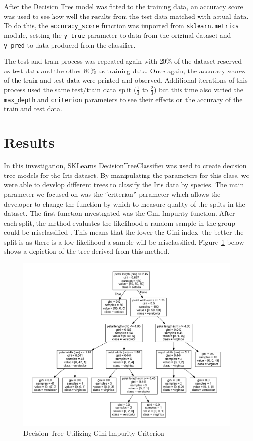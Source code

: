 \documentclass[journal]{IEEEtran}
\begin{document}
After the Decision Tree model was fitted to the training data, an accuracy score was used to see how well the results from the test data matched with actual data. To do this, the \lstinline{accuracy_score} function was imported from \lstinline{sklearn.metrics} module, setting the \lstinline{y_true} parameter to data from the original dataset and \lstinline{y_pred} to data produced from the classifier. 

The test and train process was repeated again with 20\% of the dataset reserved as test data and the other 80\% as training data. Once again, the accuracy scores of the train and test data were printed and observed. Additional iterations of this process used the same test/train data split (\(\frac{1}{3}\) to \(\frac{2}{3}\)) but this time also varied the \lstinline{max_depth} and \lstinline{criterion} parameters to see their effects on the accuracy of the train and test data.

\vspace{30px}
\section{Results}

In this investigation, SKLearn\textquotesingle s DecisionTreeClassifier was used to create decision tree models for the Iris dataset. By manipulating the parameters for this class, we were able to develop different trees to classify the Iris data by species. The main parameter we focused on was the “criterion” parameter which allows the developer to change the function by which to measure quality of the splits in the dataset. The first function investigated was the Gini Impurity function. After each split, the method evaluates the likelihood a random sample in the group could be misclassified \cite{b2}. This means that the lower the Gini index, the better the split is as there is a low likelihood a sample will be misclassified. Figure~\ref{fig:dtGI} below shows a depiction of the tree derived from this method.

\begin{figure}[h!]
\includegraphics[scale=0.25]{iris.pdf}
\centering
\caption{Decision Tree Utilizing Gini Impurity Criterion}
\label{fig:dtGI}
\end{figure}
\end{document}
